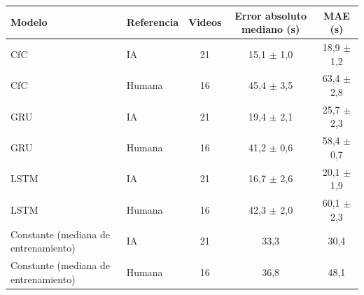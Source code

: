 \begin{tabular}{|l|l|c|c|c|}
\hline
\textbf{Modelo} & \textbf{Referencia} & \textbf{Videos} & \textbf{Error absoluto mediano (s)} & \textbf{MAE (s)} \\ \hline
CfC & IA & 21 & 15{,}1 $\pm$ 1{,}0 & 18{,}9 $\pm$ 1{,}2 \\ \hline
CfC & Humana & 16 & 45{,}4 $\pm$ 3{,}5 & 63{,}4 $\pm$ 2{,}8 \\ \hline
GRU & IA & 21 & 19{,}4 $\pm$ 2{,}1 & 25{,}7 $\pm$ 2{,}3 \\ \hline
GRU & Humana & 16 & 41{,}2 $\pm$ 0{,}6 & 58{,}4 $\pm$ 0{,}7 \\ \hline
LSTM & IA & 21 & 16{,}7 $\pm$ 2{,}6 & 20{,}1 $\pm$ 1{,}9 \\ \hline
LSTM & Humana & 16 & 42{,}3 $\pm$ 2{,}0 & 60{,}1 $\pm$ 2{,}3 \\ \hline
Constante (mediana de entrenamiento) & IA & 21 & 33{,}3 & 30{,}4 \\ \hline
Constante (mediana de entrenamiento) & Humana & 16 & 36{,}8 & 48{,}1 \\ \hline
\end{tabular}
